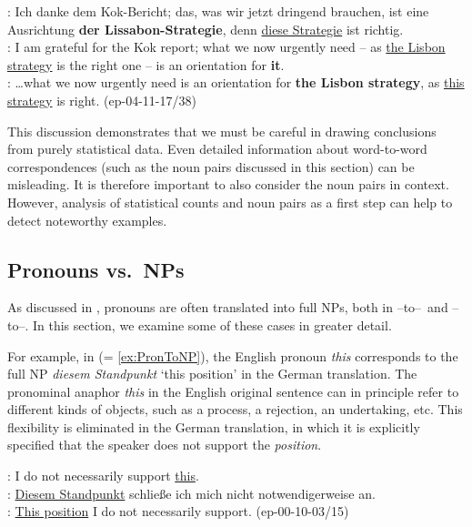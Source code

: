 \documentclass[output=paper]{LSP/langsci}
\begin{document}
\ea	\label{ex:lisbon}
\DEo : Ich danke dem Kok-Bericht; das, was wir jetzt dringend brauchen, ist eine Ausrichtung \textbf{der Lissabon-Strategie}, denn \ul{diese Strategie} ist richtig.\\
\ENt : I am grateful for the Kok report; what we now urgently need -- as \ul{the Lisbon strategy} is the right one -- is an orientation for \textbf{it}.\\
\DElit : \dots what we now urgently need is an orientation for \textbf{the Lisbon strategy}, as \ul{this strategy} is right. 
\hfill{(ep-04-11-17/38)}
\z

This discussion demonstrates that we must be careful in drawing conclusions from purely statistical data. Even detailed information about word-to-word correspondences (such as the noun pairs discussed in this section) can be misleading. It is therefore important to also consider the noun pairs in context. However, analysis of statistical counts and noun pairs as a first step can help to detect noteworthy examples. 

\subsection{Pronouns vs.\ NPs}
\label{sec:pron}
As discussed in , pronouns are often translated into full NPs, both in \DEo--to--\ENt\ and \ENo--to--\DEt. In this section, we examine some of these cases in greater detail.

For example, in  (= \ref{ex:PronToNP}), the English pronoun \textit{this} corresponds to the full NP \textit{diesem Standpunkt} `this position' in the German translation. The pronominal anaphor \textit{this} in the English original sentence can in principle refer to different kinds of objects, such as a process, a rejection, an undertaking, etc. This flexibility is eliminated in the German translation, in which it is explicitly specified that the speaker does not support the \emph{position}. %

\ea	\label{ex:standpunkt2}
\ENo : I do not necessarily support \ul{this}. \\
\DEt : \ul{Diesem Standpunkt} schlie\ss e ich mich nicht notwendigerweise an.\\
\DElit : \ul{This position} I do not necessarily support. 
\hfill{(ep-00-10-03/15)}
\z
\end{document}
